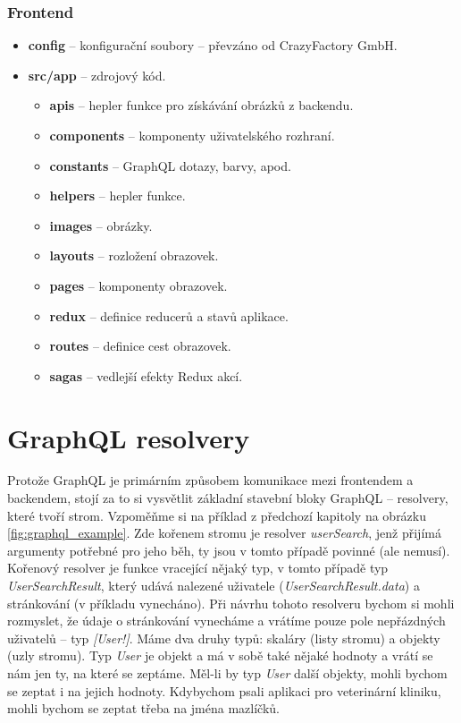 \subsubsection*{Frontend}

\begin{itemize}
  \setlength\itemsep{.05em}
  \item \textbf{config} -- konfigurační soubory -- převzáno od CrazyFactory GmbH.
  \item \textbf{src/app} -- zdrojový kód.
  \begin{itemize}
    \setlength\itemsep{.05em}
    \item \textbf{apis} -- hepler funkce pro získávání obrázků z backendu.
    \item \textbf{components} -- komponenty uživatelského rozhraní.
    \item \textbf{constants} -- GraphQL dotazy, barvy, apod.
    \item \textbf{helpers} -- hepler funkce.
    \item \textbf{images} -- obrázky.
    \item \textbf{layouts} -- rozložení obrazovek.
    \item \textbf{pages} -- komponenty obrazovek.
    \item \textbf{redux} -- definice reducerů a stavů aplikace.
    \item \textbf{routes} -- definice cest obrazovek.
    \item \textbf{sagas} -- vedlejší efekty Redux akcí.
  \end{itemize}
\end{itemize}

\section{GraphQL resolvery}

Protože GraphQL je primárním způsobem komunikace mezi frontendem a backendem, stojí za to si vysvětlit základní stavební bloky
GraphQL -- resolvery, které tvoří strom. Vzpoměňme si na příklad z předchozí kapitoly na obrázku \ref{fig:graphql_example}.
Zde kořenem stromu je resolver \textit{userSearch}, jenž přijímá argumenty potřebné pro jeho běh, ty jsou v tomto případě
povinné (ale nemusí). Kořenový resolver je funkce vracející nějaký typ, v tomto případě typ \textit{UserSearchResult}, který udává nalezené
uživatele (\textit{UserSearchResult.data}) a stránkování (v příkladu vynecháno).
Při návrhu tohoto resolveru bychom si mohli rozmyslet, že údaje o stránkování vynecháme a vrátíme pouze
pole nepřázdných uživatelů -- typ \textit{[User!]}.
Máme dva druhy typů: skaláry (listy stromu) a objekty (uzly stromu).
Typ \textit{User} je objekt a má v sobě také nějaké hodnoty a vrátí se nám jen ty, na které se zeptáme. Měl-li by typ \textit{User}
další objekty, mohli bychom se zeptat i na jejich hodnoty. Kdybychom psali aplikaci pro veterinární kliniku, mohli bychom se zeptat
třeba na jména mazlíčků.

